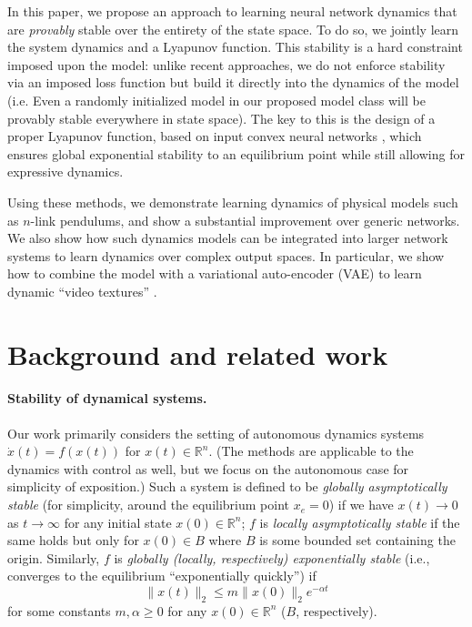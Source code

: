 In this paper, we propose an approach to learning neural network dynamics that are \emph{provably} stable over the entirety of the state space.  To do so, we jointly learn the system dynamics and a Lyapunov function.  This stability is a hard constraint imposed upon the model: unlike recent approaches, we do not enforce stability via an imposed loss function but build it directly into the dynamics of the model (i.e. Even a randomly initialized model in our proposed model class will be provably stable everywhere in state space).  The key to this is the design of a proper Lyapunov function, based on input convex neural networks \citep{amos2017input}, which ensures global exponential stability to an equilibrium point while still allowing for expressive dynamics.

Using these methods, we demonstrate learning dynamics of physical models such as $n$-link pendulums, and show a substantial improvement over generic networks.  We also show how such dynamics models can be integrated into larger network systems to learn dynamics over complex output spaces.  In particular, we show how to combine the model with a variational auto-encoder (VAE) \citep{kingma2013auto} to learn dynamic ``video textures'' \citep{schodl2000video}.

\section{Background and related work}

\paragraph{Stability of dynamical systems.} Our work primarily considers the setting of autonomous dynamics systems $\dot{x}(t) = f(x(t))$ for $x(t) \in \mathbb{R}^n$. (The methods are applicable to the dynamics with control as well, but we focus on the autonomous case for simplicity of exposition.)  Such a system is defined to be \emph{globally asymptotically stable} (for simplicity, around the equilibrium point $x_e=0$) if we have $x(t) \rightarrow 0$ as $t \rightarrow \infty$ for any initial state $x(0) \in \mathbb{R}^n$; $f$ is \emph{locally asymptotically stable} if the same holds but only for $x(0) \in B$ where $B$ is some bounded set containing the origin.  Similarly, $f$ is \emph{globally (locally, respectively) exponentially stable} (i.e., converges to the equilibrium ``exponentially quickly'') if
\begin{equation}
    \|x(t)\|_2 \leq m \|x(0)\|_2 e^{-\alpha t}
\end{equation}
for some constants $m, \alpha \geq 0$ for any $x(0) \in \mathbb{R}^n$ ($B$, respectively).

